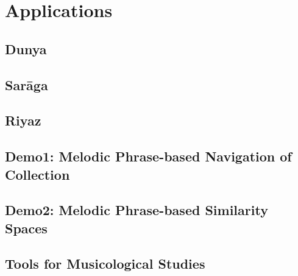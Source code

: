 
\chapter{Applications}
\label{sec:applicatoins}

\section{Dunya}
\section{Sar\={a}ga}
\section{Riyaz}
\section {Demo1: Melodic Phrase-based Navigation of Collection}
\section {Demo2: Melodic Phrase-based Similarity Spaces}
\section {Tools for Musicological Studies}



